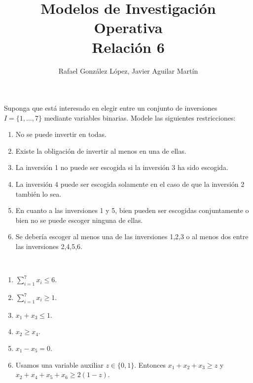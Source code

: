 \documentclass[twoside]{article}
\begin{document}
\title{Modelos de Investigación Operativa\\ Relación 6}
\author{Rafael González López, Javier Aguilar Martín}
\date{}
\maketitle

\begin{ejercicio}{1}
Suponga que está interesado en elegir entre un conjunto de inversiones $I=\{1,\dots,7\}$ mediante variables binarias. Modele las siguientes restricciones:
\begin{enumerate}
\item No se puede invertir en todas.
\item Existe la obligación de invertir al menos en una de ellas.
\item La inversión 1 no puede ser escogida si la inversión 3 ha sido escogida.
\item La inversión 4 puede ser escogida solamente en el caso de que la inversión 2 también lo sea.
\item En cuanto a las inversiones 1 y 5, bien pueden ser escogidas conjuntamente o bien no se puede escoger ninguna de ellas.
\item Se debería escoger al menos una de las inversiones 1,2,3 o al menos dos entre las inversiones 2,4,5,6.
\end{enumerate}
\end{ejercicio}
\begin{solucion}\
\begin{enumerate}
\item $\sum_{i=1}^7x_i\leq 6$. 
\item $\sum_{i=1}^7x_i\geq 1$.
\item $x_1+x_3\leq 1$.
\item $x_2\geq x_4$. 
\item $x_1-x_5=0$.
\item Usamos una variable auxiliar $z\in\{0,1\}$. Entonces $x_1+x_2+x_3\geq z$ y $x_2+x_4+x_5+x_6\geq 2(1-z)$. 
\end{enumerate}
\end{solucion}

\newpage
\end{document}

